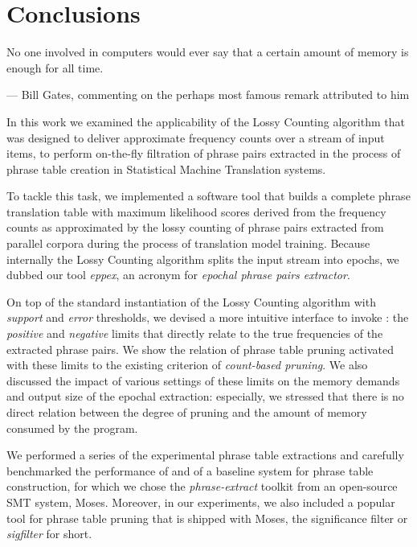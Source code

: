 \chapter{Conclusions}
\label{chap:conclusions}

\setlength{\epigraphwidth}{1.0\textwidth}
\epigraph{No one involved in computers would ever say that a certain amount of memory is enough for all time.}{--- Bill Gates, commenting on the perhaps most famous remark attributed to him}

In this work we examined the applicability of the Lossy Counting algorithm
that was designed to deliver approximate frequency counts over a stream of
input items, to perform on-the-fly filtration of phrase pairs extracted in
the process of phrase table creation in Statistical Machine Translation systems.

To tackle this task, we implemented a software tool that builds a complete phrase
translation table with maximum likelihood scores derived from the frequency
counts as approximated by the lossy counting of phrase pairs extracted from
parallel corpora during the process of translation model training.
Because internally the Lossy Counting algorithm splits the input stream into
epochs, we dubbed our tool \emph{eppex}, an acronym for \emph{epochal phrase
pairs extractor}.

On top of the standard instantiation of the Lossy Counting algorithm with
\emph{support} and \emph{error} thresholds, we devised a more intuitive interface
to invoke \eppex{}: the \emph{positive} and \emph{negative} limits that
directly relate to the true frequencies of the extracted phrase pairs.
We show the relation of phrase table pruning activated with these limits
to the existing criterion of \emph{count-based pruning}.
We also discussed the impact of various settings of these limits on the memory
demands and output size of the epochal extraction: especially, we stressed
that there is no direct relation between the degree of pruning and the amount
of memory consumed by the program.

We performed a series of the experimental phrase table extractions and carefully
benchmarked the performance of \eppex{} and of a baseline system for phrase
table construction, for which we chose the \emph{phrase-extract} toolkit from
an open-source SMT system, Moses.
Moreover, in our experiments, we also included a popular tool for phrase table
pruning that is shipped with Moses, the significance filter or \emph{sigfilter}
for short.

